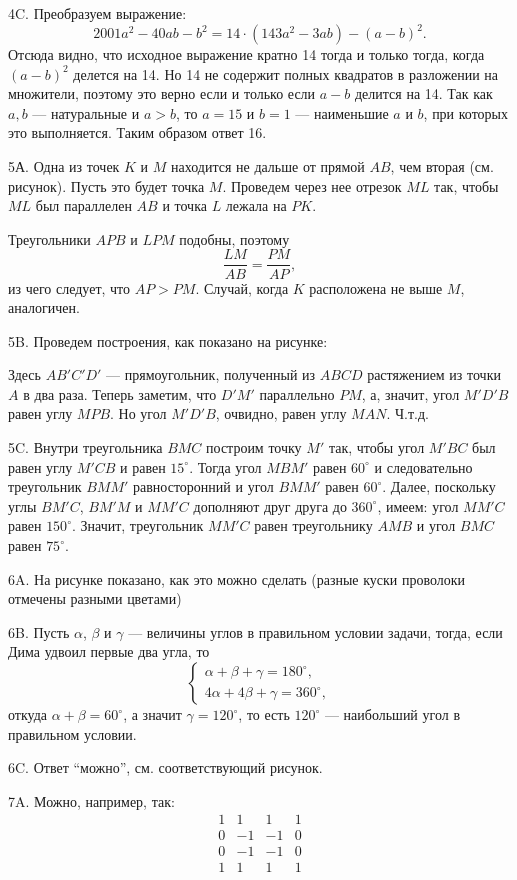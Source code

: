 \documentclass[12pt]{amsart}
\theoremstyle{definition}
\theoremstyle{remark}
\theoremstyle{plain}
\begin{document}
4C. Преобразуем выражение:
$$
2001a^2-40ab-b^2=14\cdot(143a^2-3ab)-(a-b)^2.
$$
Отсюда видно, что  исходное выражение кратно 14 тогда и только тогда, когда $(a-b)^2$ делется на 14. Но 14 не содержит полных квадратов в разложении на множители, поэтому это верно если и только если $a-b$ делится на 14. Так как $a,b$ --- натуральные и $a>b$, то $a=15$ и $b=1$ --- наименьшие $a$ и $b$, при которых это выполняется. Таким образом ответ 16.

5А. Одна из точек $K$ и $M$ находится не дальше от прямой $AB$, чем вторая (см. рисунок). Пусть это будет точка $M$. Проведем через нее отрезок $ML$ так, чтобы $ML$ был параллелен $AB$ и точка $L$ лежала на $PK$.


Треугольники $APB$ и $LPM$ подобны, поэтому
$$
\frac{LM}{AB}=\frac{PM}{AP},
$$
из чего следует, что $AP>PM$. Случай, когда $K$ расположена не выше $M$, аналогичен.

5B. Проведем построения, как показано на рисунке:

Здесь $AB'C'D'$ --- прямоугольник, полученный из $ABCD$ растяжением из точки $A$ в два раза. Теперь заметим, что $D'M'$ параллельно $PM$, а, значит, угол $M'D'B$ равен углу $MPB$. Но угол $M'D'B$, очвидно, равен углу $MAN$. Ч.т.д.

5C. Внутри треугольника $BMC$ построим точку $M'$ так, чтобы угол $M'BC$ был равен углу $M'CB$ и равен $15^{\circ}$. Тогда угол $MBM'$ равен $60^{\circ}$ и следовательно треугольник $BMM'$ равносторонний и угол $BMM'$ равен $60^{\circ}$. Далее, поскольку углы $BM'C$, $BM'M$ и $MM'C$ дополняют друг друга до $360^{\circ}$, имеем: угол $MM'C$ равен $150^{\circ}$. Значит, треугольник $MM'C$ равен треугольнику $AMB$ и угол $BMC$ равен $75^{\circ}$.

6A. На рисунке показано, как это можно сделать (разные куски проволоки отмечены разными цветами)

6B. Пусть $\alpha$, $\beta$ и $\gamma$ --- величины углов в правильном условии задачи, тогда, если Дима удвоил первые два угла, то
$$
\begin{cases}
\alpha+\beta+\gamma=180^{\circ},\\
4\alpha+4\beta+\gamma=360^{\circ},
\end{cases}
$$
откуда $\alpha+\beta=60^{\circ}$, а значит $\gamma=120^{\circ}$, то есть $120^{\circ}$ --- наибольший угол в правильном условии.

6C. Ответ "`можно"', см. соответствующий рисунок.

7A. Можно, например, так:
$$
\begin{array}{llll}
1 & 1 & 1 & 1\\
0 & -1 & -1 & 0\\
0 & -1 & -1 & 0\\
1 & 1 & 1 & 1
\end{array}
$$
\end{document}
